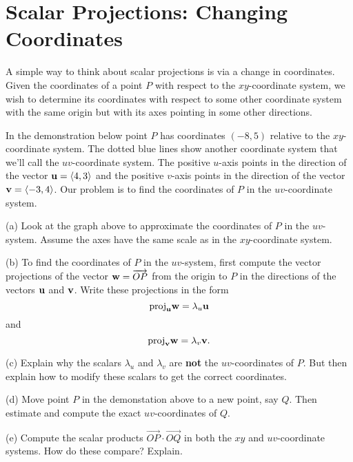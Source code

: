 \documentclass{ximera}
\begin{document}
\section{Scalar Projections: Changing Coordinates}
A simple way to think about scalar projections is via a change in coordinates. Given the coordinates of a point $P$ with respect to the $xy$-coordinate system, we wish to determine its coordinates with respect to some other coordinate system with the same origin but with its axes pointing in some other directions.

\begin{exploration}
In the demonstration below point $P$ has coordinates $(-8,5)$ relative to the $xy$-coordinate system. The dotted blue lines show another coordinate system that we'll call the $uv$-coordinate system. The positive $u$-axis points in the direction of the vector ${\bf u}=\langle 4,3\rangle$ and the positive $v$-axis points in the direction of the vector ${\bf v}=\langle -3,4\rangle$. Our problem is to find the coordinates of $P$ in the $uv$-coordinate system.

 
\begin{onlineOnly}
    \begin{center}
\end{center}
\end{onlineOnly}
\end{exploration}


\begin{question}  \label{Qgsr3452:Scalar}
(a) Look at the graph above to approximate the coordinates of $P$ in the $uv$-system. Assume the axes have the same scale as in the $xy$-coordinate system.

(b) To find the coordinates of $P$ in the $uv$-system, first compute the vector projections of the vector ${\bf w}=\overrightarrow{OP}$ from the origin to $P$ in the directions of the vectors ${\bf u}$ and ${\bf v}$. Write these projections in the form
\[
   \text{proj}_{\bf u}{\bf w} = \lambda_u {\bf u}
\]
and 
\[
   \text{proj}_{\bf v}{\bf w} = \lambda_v {\bf v} .
\]

(c) Explain why the scalars $\lambda_u$ and $\lambda_v$ are {\bf not} the $uv$-coordinates of $P$. But then explain how to modify these scalars to get the correct coordinates.

(d) Move point $P$ in the demonstation above to a new point, say $Q$. Then estimate and compute the exact $uv$-coordinates of $Q$.

(e) Compute the scalar products $\overrightarrow{OP} \cdot \overrightarrow{OQ}$ in both the $xy$ and $uv$-coordinate systems. How do these compare? Explain.
\end{question}
\end{document}
